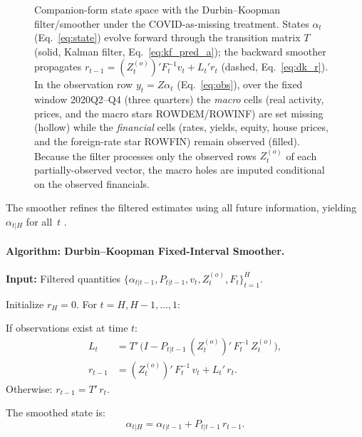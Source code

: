 \documentclass[11pt]{article}
\theoremstyle{definition}
\theoremstyle{remark}
\begin{document}
\begin{figure}[!ht]
\caption{Companion-form state space with the Durbin--Koopman
filter/smoother under the COVID-as-missing treatment.  States
$\alpha_t$ (Eq.~\eqref{eq:state}) evolve forward through the transition
matrix $T$ (solid, Kalman filter, Eq.~\eqref{eq:kf_pred_a}); the
backward smoother propagates
$r_{t-1}=(Z_t^{(o)})'F_t^{-1}v_t+L_t'r_t$
(dashed, Eq.~\eqref{eq:dk_r}).  In the observation row
$y_t=Z\alpha_t$ (Eq.~\eqref{eq:obs}), over the fixed window
2020Q2--Q4 (three quarters) the \emph{macro} cells (real activity,
prices, and the macro stars ROWDEM/ROWINF) are set missing (hollow)
while the \emph{financial} cells (rates, yields, equity, house prices,
and the foreign-rate star ROWFIN) remain observed (filled).  Because
the filter processes only the observed rows $Z_t^{(o)}$ of each
partially-observed vector, the macro holes are imputed conditional on
the observed financials.}
\label{fig:statespace-dk}
\end{figure}

The smoother refines the filtered estimates using all future
information, yielding $\alpha_{t|H}$ for all~$t$
\citep{DurbinKoopman2002, DurbinKoopman2012}.

\paragraph{Algorithm: Durbin--Koopman Fixed-Interval Smoother.}
\label{alg:dk}
\textbf{Input:} Filtered quantities
$\{\alpha_{t|t-1}, P_{t|t-1}, v_t, Z_t^{(o)}, F_t\}_{t=1}^{H}$.

\noindent Initialize $r_H = 0$.  For $t = H, H{-}1, \ldots, 1$:

If observations exist at time $t$:
\begin{align}
  L_t &= T'\,\bigl(I - P_{t|t-1}\, (Z_t^{(o)})'\,
    F_t^{-1}\, Z_t^{(o)}\bigr), \label{eq:dk_L} \\
  r_{t-1} &= (Z_t^{(o)})'\, F_t^{-1}\, v_t + L_t'\, r_t.
    \label{eq:dk_r}
\end{align}
Otherwise: $r_{t-1} = T'\, r_t$.

\noindent The smoothed state is:
\begin{equation}\label{eq:dk_smooth}
  \alpha_{t|H} = \alpha_{t|t-1} + P_{t|t-1}\, r_{t-1}.
\end{equation}
\end{document}
